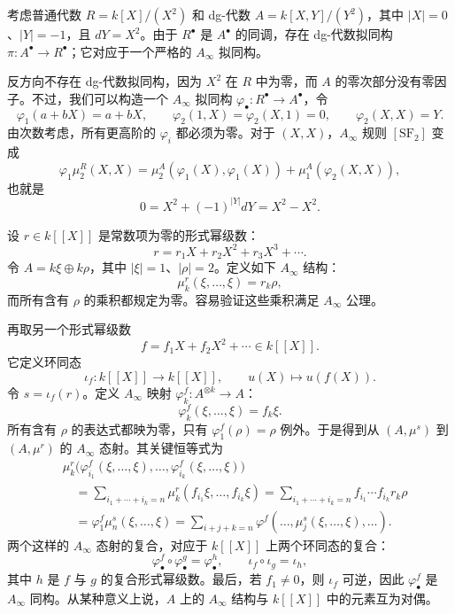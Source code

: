 \begin{example}[dg-代数拟同构不必反向存在]\label{ex:dg-quasiisomorphism-ainfty}
考虑普通代数 $R=k[X]/(X^2)$ 和 dg-代数 $A=k[X,Y]/(Y^2)$，其中 $|X|=0$、$|Y|=-1$，且 $dY=X^2$。由于 $R^\bullet$ 是 $A^\bullet$ 的同调，存在 dg-代数拟同构 $\pi\colon A^\bullet\to R^\bullet$；它对应于一个严格的 $A_\infty$ 拟同构。

反方向不存在 dg-代数拟同构，因为 $X^2$ 在 $R$ 中为零，而 $A$ 的零次部分没有零因子。不过，我们可以构造一个 $A_\infty$ 拟同构 $\varphi_\bullet\colon R^\bullet\to A^\bullet$，令
\[
  \varphi_1(a+bX)=a+bX,\qquad
  \varphi_2(1,X)=\varphi_2(X,1)=0,\qquad
  \varphi_2(X,X)=Y.
\]
由次数考虑，所有更高阶的 $\varphi_i$ 都必须为零。对于 $(X,X)$，$A_\infty$ 规则 $[\mathrm{SF}_2]$ 变成
\[
  \varphi_1\mu_2^R(X,X)
  =\mu_2^A(\varphi_1(X),\varphi_1(X))
   +\mu_1^A(\varphi_2(X,X)),
\]
也就是
\[
  0=X^2+(-1)^{|Y|}dY=X^2-X^2.
\]
\end{example}

\begin{example}\label{ex:ainfty-formal-series}
设 $r\in k[[X]]$ 是常数项为零的形式幂级数：
\[
  r=r_1X+r_2X^2+r_3X^3+\cdots.
\]
令 $A=k\xi\oplus k\rho$，其中 $|\xi|=1$、$|\rho|=2$。定义如下 $A_\infty$ 结构：
\[
  \mu_k^r(\xi,\ldots,\xi)=r_k\rho,
\]
而所有含有 $\rho$ 的乘积都规定为零。容易验证这些乘积满足 $A_\infty$ 公理。

再取另一个形式幂级数
\[
  f=f_1X+f_2X^2+\cdots\in k[[X]].
\]
它定义环同态
\[
  \iota_f\colon k[[X]]\to k[[X]],\qquad
  u(X)\longmapsto u(f(X)).
\]
令 $s=\iota_f(r)$。定义 $A_\infty$ 映射 $\varphi_k^f\colon A^{\otimes k}\to A$：
\[
  \varphi_k^f(\xi,\ldots,\xi)=f_k\xi.
\]
所有含有 $\rho$ 的表达式都映为零，只有 $\varphi_1^f(\rho)=\rho$ 例外。于是得到从 $(A,\mu^s)$ 到 $(A,\mu^r)$ 的 $A_\infty$ 态射。其关键恒等式为
\begin{align*}
  &\mu_k^r\bigl(\varphi_{i_1}^f(\xi,\ldots,\xi),\ldots,
                       \varphi_{i_k}^f(\xi,\ldots,\xi)\bigr)\\
  &\quad=\sum_{i_1+\cdots+i_k=n}
       \mu_k^r(f_{i_1}\xi,\ldots,f_{i_k}\xi)
   =\sum_{i_1+\cdots+i_k=n}f_{i_1}\cdots f_{i_k}r_k\rho\\
  &\quad=\varphi_1^f\mu_n^s(\xi,\ldots,\xi)
   =\sum_{i+j+k=n}
     \varphi^f(\ldots,\mu_j^s(\xi,\ldots,\xi),\ldots).
\end{align*}
两个这样的 $A_\infty$ 态射的复合，对应于 $k[[X]]$ 上两个环同态的复合：
\[
  \varphi_\bullet^f\circ\varphi_\bullet^g=\varphi_\bullet^h,
  \qquad \iota_f\circ\iota_g=\iota_h,
\]
其中 $h$ 是 $f$ 与 $g$ 的复合形式幂级数。最后，若 $f_1\neq0$，则 $\iota_f$ 可逆，因此 $\varphi_\bullet^f$ 是 $A_\infty$ 同构。从某种意义上说，$A$ 上的 $A_\infty$ 结构与 $k[[X]]$ 中的元素互为对偶。
\end{example}


